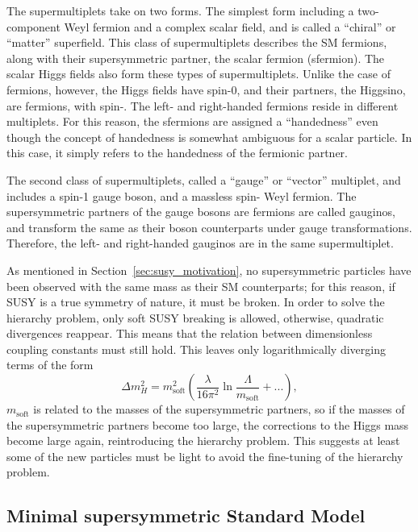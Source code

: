The supermultiplets take on two forms.
The simplest form including a two-component Weyl fermion and a complex scalar
field, and is called a ``chiral'' or ``matter'' superfield.
This class of supermultiplets describes the SM fermions, along with their
supersymmetric partner, the scalar fermion (sfermion).
The scalar Higgs fields also form these types of supermultiplets.
Unlike the case of fermions, however, the Higgs fields have spin-0, and their
partners, the Higgsino, are fermions, with spin-.
The left- and right-handed fermions reside in different multiplets.
For this reason, the sfermions are assigned a ``handedness'' even though
the concept of handedness is somewhat ambiguous for a scalar particle.
In this case, it simply refers to the handedness of the fermionic partner.

The second class of supermultiplets, called a ``gauge'' or ``vector''
multiplet, and includes a spin-1 gauge boson, and a massless
spin- Weyl fermion.
The supersymmetric partners of the gauge bosons are fermions are called
gauginos, and transform the same as their boson counterparts under gauge
transformations.
Therefore, the left- and right-handed gauginos are in the same supermultiplet.

As mentioned in Section~\ref{sec:susy_motivation}, no supersymmetric particles
have been observed with the same mass as their SM counterparts; for this
reason, if SUSY is a true symmetry of nature, it must be broken.
In order to solve the hierarchy problem, only soft SUSY breaking is allowed,
otherwise, quadratic divergences reappear.
This means that the relation between dimensionless coupling constants must
still hold.
This leaves only logarithmically diverging terms of the form
\begin{equation}
  \Delta m_{H}^2 =
  m_\mathrm{soft}^2
  \left(
    \frac{\lambda}{16\pi^2}
    \ln \frac{\Lambda}{m_\mathrm{soft}}
    + ...
  \right),
\end{equation}
$m_\mathrm{soft}$ is related to the masses of the supersymmetric partners, so
if the masses of the supersymmetric partners become too large,
the corrections to the Higgs mass become large again, reintroducing the
hierarchy problem.
This suggests at least some of the new particles must be light to avoid
the fine-tuning of the hierarchy problem.

\FloatBarrier
\subsection{Minimal supersymmetric Standard Model}
\label{sec:mssm}

